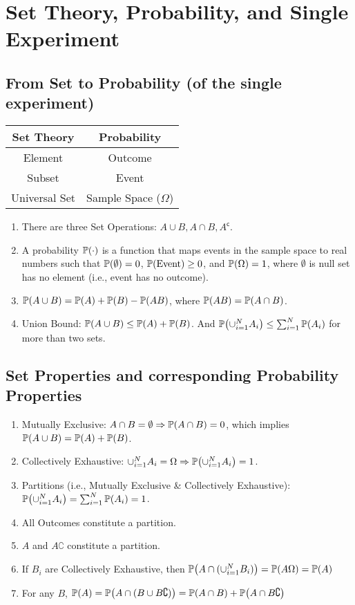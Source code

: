 \chapter{Set Theory, Probability, and Single Experiment}
\section{From Set to Probability (of the single experiment)}
\begin{center}
\begin{tabular}{|c|c|}
    \hline
    \textbf{Set Theory} & \textbf{Probability} \\
    \hline
    \hline
    Element & Outcome \\
    \hline
    Subset  & Event   \\
    \hline
    Universal Set & Sample Space ($\Omega$) \\
    \hline
\end{tabular}
\end{center}
\begin{enumerate}
    \item There are three Set Operations: $A \cup B, A \cap B, A^{\mathsf{c}}$.
    \item A probability $\P{\cdot}$ is a function that maps events in the sample space to real numbers such that $\P{\emptyset}=0$, $\P{\text{Event}}\geq 0$, and $\P{\Omega}=1$, where $\emptyset$ is null set has no element (i.e., event has no outcome).
    \item $\P{A \cup B} = \P{A}+\P{B}-\P{AB}$, where $\P{AB}=\P{A\cap B}$.
    \item Union Bound: $\P{A\cup B}\leq \P{A}+\P{B}$. And $\P{\cup_{i=1}^N A_i}\leq \sum_{i=1}^{N}\P{A_i}$ for more than two sets.
\end{enumerate}
\section{Set Properties and corresponding Probability Properties}
\begin{enumerate}
    \item Mutually Exclusive: $A \cap B = \emptyset \Rightarrow \P{A \cap B}=0$, which implies $\P{A \cup B} = \P{A}+\P{B}$.
    \item Collectively Exhaustive: $\cup_{i=1}^{N}A_i = \Omega \Rightarrow \P{\cup_{i=1}^{N}A_i} = 1$.
    \item Partitions (i.e., Mutually Exclusive \& Collectively Exhaustive): $\P{\cup_{i=1}^N A_i}=\sum_{i=1}^{N}\P{A_i}=1$.
    \item All Outcomes constitute a partition.
    \item $A$ and $A\complement$ constitute a partition.
    \item If $B_i$ are Collectively Exhaustive, then $\P{A\cap(\cup_{i=1}^N B_i)}=\P{A\Omega}=\P{A}$
    \item For any $B$, $\P{A}=\P{A\cap(B\cup B\complement)}=\P{A\cap B}+\P{A\cap B\complement}$
\end{enumerate}
